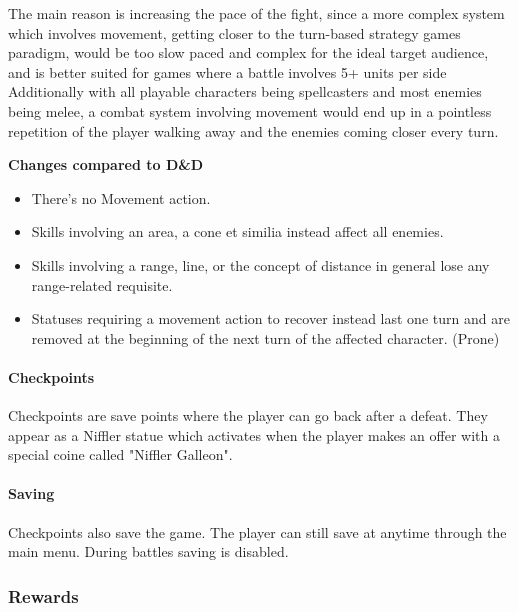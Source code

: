 The main reason is increasing the pace of the fight, since a more complex system which involves movement, getting closer to the turn-based strategy games paradigm, would be too slow paced and complex for the ideal target audience, and is better suited for games where a battle involves 5+ units per side Additionally with all playable characters being spellcasters and most enemies being melee, a combat system involving movement would end up in a pointless repetition of the player walking away and the enemies coming closer every turn.

\textbf{Changes compared to D\&D}
\begin{itemize}
	\item There's no Movement action.
	\item Skills involving an area, a cone et similia instead affect all enemies.
	\item Skills involving a range, line, or the concept of distance in general lose any range-related requisite.
	\item Statuses requiring a movement action to recover instead last one turn and are removed at the beginning of the next turn of the affected character. (Prone)
\end{itemize}

\pagebreak

\paragraph{Checkpoints}

Checkpoints are save points where the player can go back after a defeat. They appear as a Niffler statue which activates when the player makes an offer with a special coine called "Niffler Galleon".

\paragraph{Saving}

Checkpoints also save the game. The player can still save at anytime through the main menu. During battles saving is disabled.

\subsubsection{Rewards}

